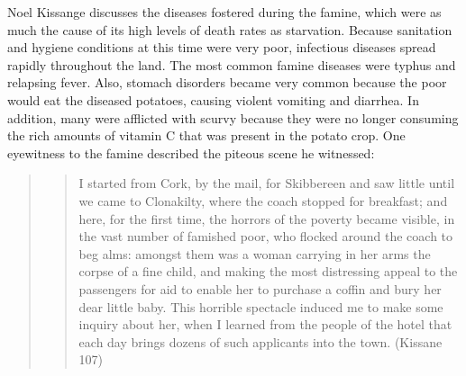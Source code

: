 \begin{Spacing}{1.5}

\hspace{.4in}Noel Kissange discusses the diseases fostered during the famine, which were as much the cause of its high levels of death rates as starvation. Because sanitation and hygiene conditions at this time were very poor, infectious diseases spread rapidly throughout the land. The most common famine diseases were typhus and relapsing fever. Also, stomach disorders became very common because the poor would eat the diseased potatoes, causing violent vomiting and diarrhea. In addition, many were afflicted with scurvy because they were no longer consuming the rich amounts of vitamin C that was present in the potato crop. One eyewitness to the famine described the piteous scene he witnessed:
\begin{quote}
\begin{quote}
I started from Cork, by the mail, for Skibbereen and saw little until we came to Clonakilty, where the coach stopped for breakfast; and here, for the first time, the horrors of the poverty became visible, in the vast number of famished poor, who flocked around the coach to beg alms: amongst them was a woman carrying in her arms the corpse of a fine child, and making the most distressing appeal to the passengers for aid to enable her to purchase a coffin and bury her dear little baby. This horrible spectacle induced me to make some inquiry about her, when I learned from the people of the hotel that each day brings dozens of such applicants into the town. (Kissane 107)\end{quote}\end{quote}


\end{Spacing}

